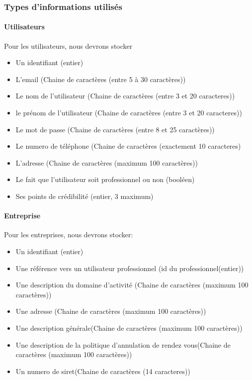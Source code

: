 \documentclass{article}
\begin{document}
\subsubsection{Types d'informations utilisés}
\paragraph{Utilisateurs}
Pour les utilisateurs, nous devrons stocker
\begin{itemize}
\item Un identifiant (entier)
\item L'email (Chaine de caractères (entre 5 à 30 caractères))
\item Le nom de l'utilisateur (Chaine de caractères (entre 3 et 20 caracteres))
\item le prénom de l'utilisateur (Chaine de caractères (entre 3 et 20 caracteres))
\item Le mot de passe (Chaine de caractères (entre 8 et 25 caractères))
\item Le numero de téléphone (Chaine de caractères (exactement 10 caracteres)
\item L'adresse (Chaine de caractères (maximum 100 caractères))
\item Le fait que l'utilisateur soit professionnel ou non (booléen)
\item Ses points de crédibilité (entier, 3 maximum)
\end{itemize}

\paragraph{Entreprise}
Pour les entreprises, nous devrons stocker:
\begin{itemize}
\item Un identifiant (entier)
\item Une référence vers un utilisateur professionnel (id du professionnel(entier))
\item Une description du domaine d'activité (Chaine de caractères (maximum 100 caractères))
\item Une adresse (Chaine de caractères (maximum 100 caractères))
\item Une description générale(Chaine de caractères (maximum 100 caractères))
\item Une description de la politique d'annulation de rendez vous(Chaine de caractères (maximum 100 caractères))
\item Un numero de siret(Chaine de caractères (14 caracteres))
\end{itemize}
\end{document}
